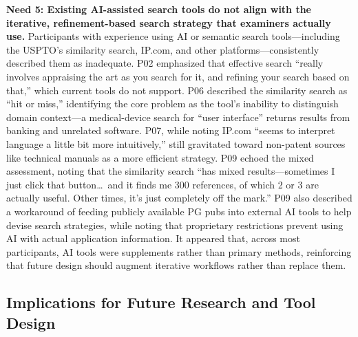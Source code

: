 \documentclass[sigconf]{acmart}
\begin{document}
\smallskip\noindent\textbf{Need 5: Existing AI-assisted search tools do not align with the iterative, refinement-based search strategy that examiners actually use.}
Participants with experience using AI or semantic search tools---including the USPTO's similarity search, IP.com, and other platforms---consistently described them as inadequate. P02 emphasized that effective search ``really involves appraising the art as you search for it, and refining your search based on that,'' which current tools do not support. P06 described the similarity search as ``hit or miss,'' identifying the core problem as the tool's inability to distinguish domain context---a medical-device search for ``user interface'' returns results from banking and unrelated software. P07, while noting IP.com ``seems to interpret language a little bit more intuitively,'' still gravitated toward non-patent sources like technical manuals as a more efficient strategy. P09 echoed the mixed assessment, noting that the similarity search ``has mixed results---sometimes I just click that button\ldots\ and it finds me 300 references, of which 2 or 3 are actually useful. Other times, it's just completely off the mark.'' P09 also described a workaround of feeding publicly available PG pubs into external AI tools to help devise search strategies, while noting that proprietary restrictions prevent using AI with actual application information. It appeared that, across most participants, AI tools were supplements rather than primary methods, reinforcing that future design should augment iterative workflows rather than replace them.

\subsection{Implications for Future Research and Tool Design}
\end{document}

